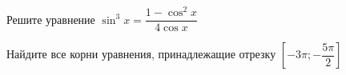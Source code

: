 \begin{ex}
	\begin{condition}
		\begin{enumcols}[label=\asbuk*)]
			\item Решите уравнение \( \sin^3 x = \dfrac{1 - \cos^2 x}{4\cos x} \)
			\item Найдите все корни уравнения, принадлежащие отрезку \( \left[-3\pi;-\dfrac{5\pi}{2}\right] \)
		\end{enumcols}
	\end{condition}
\end{ex}